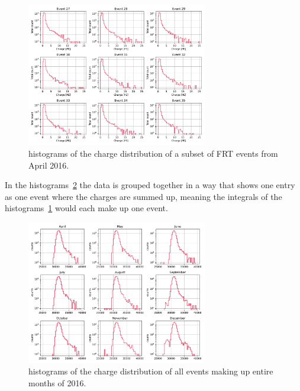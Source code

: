 \begin{figure}
    \centering
    \includegraphics[width=0.7\textwidth]{Plots/single_charge_hist.pdf}
    \caption{histograms of the charge distribution of a subset of FRT events from April 2016.}
    \label{fig:single_charge_hist}
\end{figure}

In the histograms~\ref{fig:monthly_charge_hist} the data is grouped together in a way that shows one entry as one event where the charges are summed up, meaning the 
integrals of the histograms~\ref{fig:single_charge_hist} would each make up one event. 

\begin{figure}
    \centering
    \includegraphics[width=0.7\textwidth]{Plots/monthly_charge_hist.pdf}
    \caption{histograms of the charge distribution of all events making up entire months of 2016.}
    \label{fig:monthly_charge_hist}
\end{figure}

